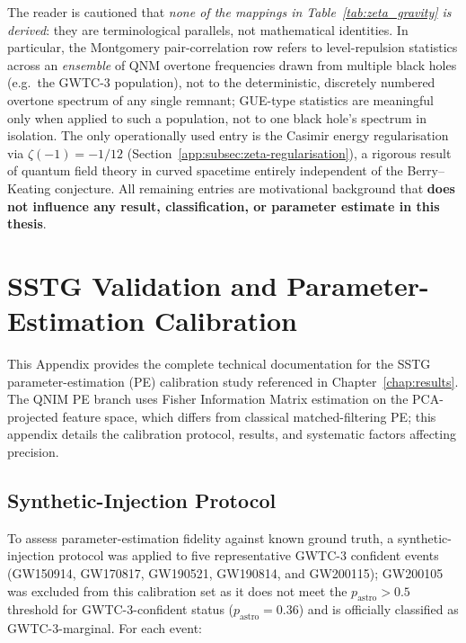\documentclass[11pt,a4paper, english]{book}
\theoremstyle{plain}
\theoremstyle{definition}
\numberwithin{equation}{chapter}
\numberwithin{figure}{chapter}
\numberwithin{table}{chapter}
\begin{document}
\noindent The reader is cautioned that \emph{none of the mappings in
Table~\ref{tab:zeta_gravity} is derived}: they are terminological
parallels, not mathematical identities.  In particular, the
Montgomery pair-correlation row refers to level-repulsion statistics
across an \emph{ensemble} of QNM overtone frequencies drawn from
multiple black holes (e.g.\ the GWTC-3 population), not to the
deterministic, discretely numbered overtone spectrum of any single
remnant; GUE-type statistics are meaningful only when applied to such
a population, not to one black hole's spectrum in isolation.
The only operationally used entry is the Casimir energy regularisation
via $\zeta(-1) = -1/12$
(Section~\ref{app:subsec:zeta-regularisation}), a rigorous result of
quantum field theory in curved spacetime \cite{Hawking_1975} entirely
independent of the Berry--Keating conjecture.  All remaining entries
are motivational background that \textbf{does not influence any
result, classification, or parameter estimate in this thesis}.
\chapter{SSTG Validation and Parameter-Estimation Calibration}
\label{app:sstg-pe-calib}

This Appendix provides the complete technical documentation for the SSTG parameter-estimation (PE) calibration study referenced in Chapter~\ref{chap:results}. The QNIM PE branch uses Fisher Information Matrix estimation on the PCA-projected feature space, which differs from classical matched-filtering PE; this appendix details the calibration protocol, results, and systematic factors affecting precision.

\section{Synthetic-Injection Protocol}

To assess parameter-estimation fidelity against known ground truth, a synthetic-injection protocol was applied to five representative GWTC-3
confident events (GW150914, GW170817, GW190521, GW190814, and
GW200115); GW200105 was excluded from this calibration set as it does
not meet the $p_\mathrm{astro}>0.5$ threshold for GWTC-3-confident
status ($p_\mathrm{astro}=0.36$) and is officially classified as
GWTC-3-marginal. For each event:
\end{document}
